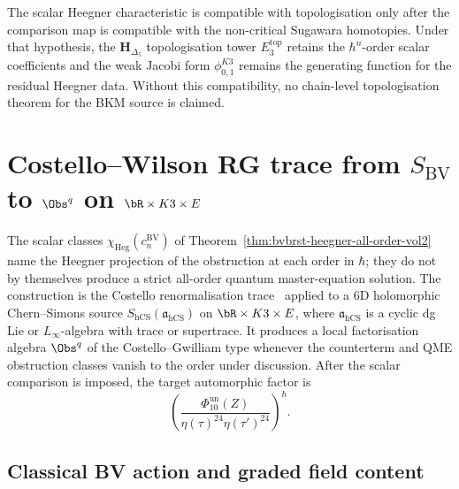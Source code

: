 \begin{remark}
\label{rem:vol2-bvbrst-heegner-topologisation}
The scalar Heegner characteristic is compatible with topologisation
only after the comparison map is compatible with the non-critical
Sugawara homotopies. Under that hypothesis, the
\(\mathbf{H}_{\Delta_5}\) topologisation tower \(E_3^{\mathrm{top}}\)
retains the \(\hbar^n\)-order scalar coefficients and the weak Jacobi
form \(\phi_{0,1}^{K3}\) remains the generating function for the residual
Heegner data. Without this compatibility, no chain-level
topologisation theorem for the BKM source is claimed.
\end{remark}

\section{Costello--Wilson RG trace from $S_{\mathrm{BV}}$ to
 $\Obs^q$ on $\bR\times K3\times E$}
\label{sec:vol2-bvbrst-costello-rg-trace}

The scalar classes
\(\chi_{\mathrm{Heg}}(c_n^{\mathrm{BV}})\) of
Theorem~\ref{thm:bvbrst-heegner-all-order-vol2} name the Heegner
projection of the obstruction at each order in $\hbar$; they do not by
themselves produce a strict all-order quantum master-equation solution.
The construction is the Costello renormalisation
trace~\cite[Ch.~2--5]{Cos11} applied to a 6D holomorphic
Chern--Simons source \(S_{\mathrm{hCS}}(\mathfrak a_{\mathrm{hCS}})\)
on $\bR\times K3\times E$, where \(\mathfrak a_{\mathrm{hCS}}\) is a
cyclic dg Lie or \(L_\infty\)-algebra with trace or supertrace. It
produces a local factorisation algebra $\Obs^q$ of the
Costello--Gwilliam type
\cite[Ch.~9, Vol.~1]{CostelloGwilliam2017} whenever the counterterm and
QME obstruction classes vanish to the order under discussion. After the
scalar comparison is imposed, the target automorphic factor is
\[
\left(
\frac{\Phi_{10}^{\mathrm{un}}(Z)}
{\eta(\tau)^{24}\eta(\tau')^{24}}
\right)^{\hbar}.
\]

\subsection{Classical BV action and graded field content}
\label{subsec:costello-trace-classical}

